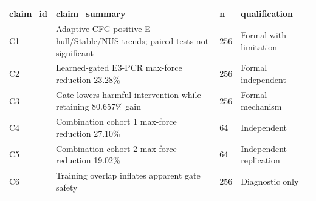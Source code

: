 \begin{tabular}{llll}
\toprule
claim\_id & claim\_summary & n & qualification \\
\midrule
C1 & Adaptive CFG positive E-hull/Stable/NUS trends; paired tests not significant & 256 & Formal with limitation \\
C2 & Learned-gated E3-PCR max-force reduction 23.28\% & 256 & Formal independent \\
C3 & Gate lowers harmful intervention while retaining 80.657\% gain & 256 & Formal mechanism \\
C4 & Combination cohort 1 max-force reduction 27.10\% & 64 & Independent \\
C5 & Combination cohort 2 max-force reduction 19.02\% & 64 & Independent replication \\
C6 & Training overlap inflates apparent gate safety & 256 & Diagnostic only \\
\bottomrule
\end{tabular}
